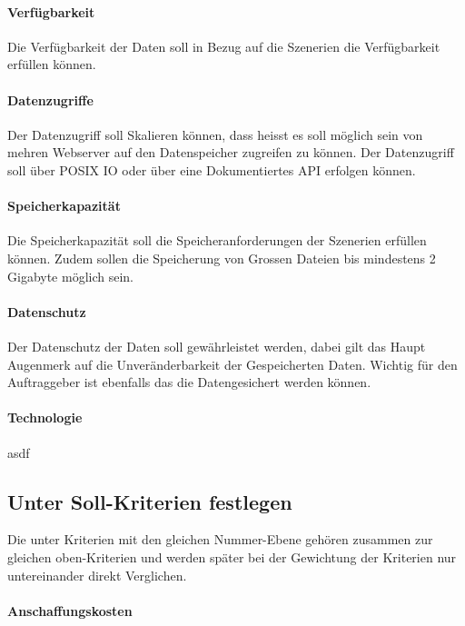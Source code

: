 \paragraph{Verfügbarkeit}\label{Soll-2}
Die Verfügbarkeit der Daten soll in Bezug auf die Szenerien die Verfügbarkeit erfüllen können. 

\paragraph{Datenzugriffe}\label{Soll-3}
Der Datenzugriff soll Skalieren können, dass heisst es soll möglich sein von mehren Webserver auf den Datenspeicher zugreifen zu können. Der Datenzugriff soll über POSIX IO oder über eine Dokumentiertes API erfolgen können.

\paragraph{Speicherkapazität}\label{Soll-4}
Die Speicherkapazität soll die Speicheranforderungen der Szenerien erfüllen können. Zudem sollen die Speicherung von Grossen Dateien bis mindestens 2 Gigabyte möglich sein.

\paragraph{Datenschutz}\label{Soll-5}
Der Datenschutz der Daten soll gewährleistet werden, dabei gilt das Haupt Augenmerk auf die Unveränderbarkeit der Gespeicherten Daten. Wichtig für den Auftraggeber ist ebenfalls das die Datengesichert werden können.

\paragraph{Technologie}\label{Soll-6}
asdf

\subsection{Unter Soll-Kriterien festlegen}
Die unter Kriterien mit den gleichen Nummer-Ebene gehören zusammen zur gleichen oben-Kriterien und werden später bei der Gewichtung der Kriterien nur untereinander direkt Verglichen.

\setcounter{paragraph}{0}
\renewcommand\theparagraph{Soll-1-\arabic{paragraph}}

\paragraph{Anschaffungskosten}\label{Soll-1-1}

